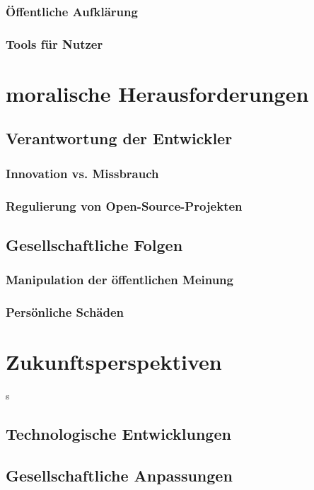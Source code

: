 \documentclass[a4paper,12pt]{article}
\begin{document}
\subsubsection{Öffentliche Aufklärung}
\subsubsection{Tools für Nutzer}
\newpage

\section{moralische Herausforderungen}
\subsection{Verantwortung der Entwickler}
\subsubsection{Innovation vs. Missbrauch}
\subsubsection{Regulierung von Open-Source-Projekten}
\subsection{Gesellschaftliche Folgen}
\subsubsection{Manipulation der öffentlichen Meinung}
\subsubsection{Persönliche Schäden}
\newpage

\section{Zukunftsperspektiven}s
\subsection{Technologische Entwicklungen}
\subsection{Gesellschaftliche Anpassungen}
\newpage
\end{document}
